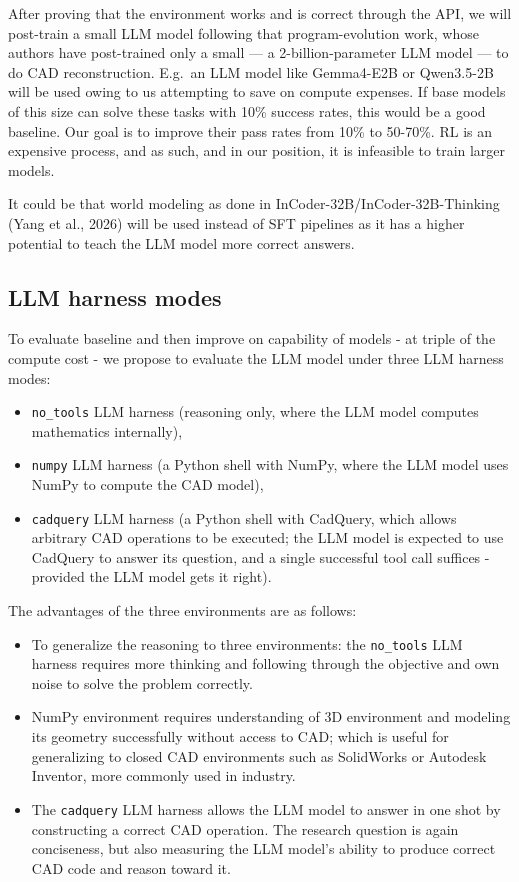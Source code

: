 \documentclass[10pt]{article}
\begin{document}
After proving that the environment works and is correct through the API, we will post-train a small LLM model following that program-evolution work, whose authors have post-trained only a small --- a 2-billion-parameter LLM model --- to do CAD reconstruction. E.g.\ an LLM model like Gemma4-E2B or Qwen3.5-2B will be used owing to us attempting to save on compute expenses. If base models of this size can solve these tasks with 10\% success rates, this would be a good baseline. Our goal is to improve their pass rates from 10\% to 50-70\%. RL is an expensive process, and as such, and in our position, it is infeasible to train larger models.

It could be that world modeling as done in InCoder-32B/InCoder-32B-Thinking (Yang et al., 2026) will be used instead of SFT pipelines as it has a higher potential to teach the LLM model more correct answers.

\subsection{LLM harness modes}

To evaluate baseline and then improve on capability of models - at triple of the compute cost - we propose to evaluate the LLM model under three LLM harness modes:
\begin{itemize}
  \item \texttt{no\_tools} LLM harness (reasoning only, where the LLM model computes mathematics internally),
  \item \texttt{numpy} LLM harness (a Python shell with NumPy, where the LLM model uses NumPy to compute the CAD model),
  \item \texttt{cadquery} LLM harness (a Python shell with CadQuery, which allows arbitrary CAD operations to be executed; the LLM model is expected to use CadQuery to answer its question, and a single successful tool call suffices - provided the LLM model gets it right).
\end{itemize}

The advantages of the three environments are as follows:
\begin{itemize}
  \item To generalize the reasoning to three environments: the \texttt{no\_tools} LLM harness requires more thinking and following through the objective and own noise to solve the problem correctly.
  \item NumPy environment requires understanding of 3D environment and modeling its geometry successfully without access to CAD; which is useful for generalizing to closed CAD environments such as SolidWorks or Autodesk Inventor, more commonly used in industry.
  \item The \texttt{cadquery} LLM harness allows the LLM model to answer in one shot by constructing a correct CAD operation. The research question is again conciseness, but also measuring the LLM model's ability to produce correct CAD code and reason toward it.
\end{itemize}
\end{document}
